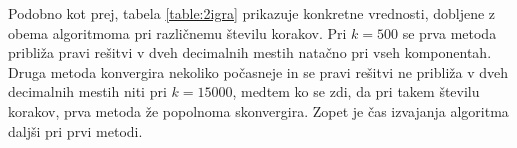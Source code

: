 \documentclass[a4paper,12pt]{article}
\begin{document}
Podobno kot prej, tabela \ref{table:2igra} prikazuje konkretne vrednosti, dobljene z obema algoritmoma pri različnemu številu korakov. Pri $k = 500$ se prva metoda približa 
pravi rešitvi v dveh decimalnih mestih natačno pri vseh komponentah. Druga metoda konvergira
nekoliko počasneje in se pravi rešitvi ne približa v dveh decimalnih mestih niti pri $k = 15000$, medtem ko se zdi, da pri takem številu korakov, prva metoda
že popolnoma skonvergira.  Zopet je čas izvajanja algoritma daljši pri prvi metodi. 
\begin{table}[]
\end{table}
\end{document}
